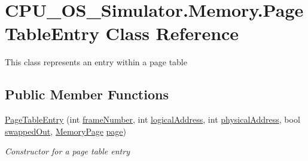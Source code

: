 \hypertarget{class_c_p_u___o_s___simulator_1_1_memory_1_1_page_table_entry}{}\section{C\+P\+U\+\_\+\+O\+S\+\_\+\+Simulator.\+Memory.\+Page\+Table\+Entry Class Reference}
\label{class_c_p_u___o_s___simulator_1_1_memory_1_1_page_table_entry}


This class represents an entry within a page table  


\subsection*{Public Member Functions}
\begin{DoxyCompactItemize}
\item 
\hyperlink{class_c_p_u___o_s___simulator_1_1_memory_1_1_page_table_entry_a5c70feafd00522bc15c8b5461ae22622}{Page\+Table\+Entry} (int \hyperlink{class_c_p_u___o_s___simulator_1_1_memory_1_1_page_table_entry_ab3e63e9a522928053429134a5da1be6f}{frame\+Number}, int \hyperlink{class_c_p_u___o_s___simulator_1_1_memory_1_1_page_table_entry_a8450b36db4a744e50336172e5d4b46b2}{logical\+Address}, int \hyperlink{class_c_p_u___o_s___simulator_1_1_memory_1_1_page_table_entry_a71d2929d34816c5f6a52a66e08ef879c}{physical\+Address}, bool \hyperlink{class_c_p_u___o_s___simulator_1_1_memory_1_1_page_table_entry_ab31d6265aff999ff7a94481f1efc45b5}{swapped\+Out}, \hyperlink{class_c_p_u___o_s___simulator_1_1_memory_1_1_memory_page}{Memory\+Page} \hyperlink{class_c_p_u___o_s___simulator_1_1_memory_1_1_page_table_entry_a6b89a8e8d1cbbd3b52a7af37ba8669a7}{page})
\begin{DoxyCompactList}\small\item\em Constructor for a page table entry \end{DoxyCompactList}\end{DoxyCompactItemize}
